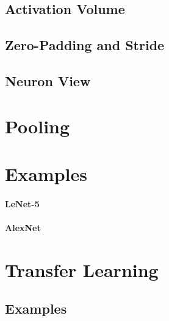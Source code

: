 		\subsection{Activation Volume} %

		\subsection{Zero-Padding and Stride} %

		\subsection{Neuron View} %

	\section{Pooling} %

	\section{Examples} %

		\paragraph{LeNet-5} %

		\paragraph{AlexNet} %

	\section{Transfer Learning} %

		\subsection{Examples} %

